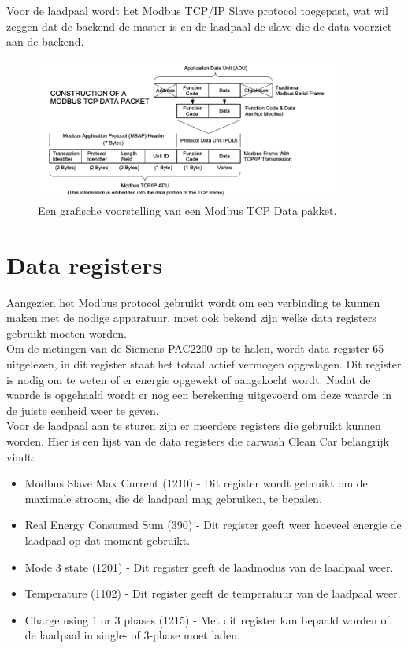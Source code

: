 Voor de laadpaal wordt het Modbus TCP/IP Slave protocol toegepast, wat wil zeggen dat de backend de master is en de laadpaal de slave die de data voorziet aan de backend.

\begin{figure}[h]
    \includegraphics[width=10cm]{./graphics/Modbus-TCP-schema.png}
    \caption{Een grafische voorstelling van een Modbus TCP Data pakket. \autocite{Acromag2005}}
    \label{fig:modbus-data-pakket}
\end{figure}

\section{Data registers}
\label{sec:stand-van-zaken-dataregisters}

Aangezien het Modbus protocol gebruikt wordt om een verbinding te kunnen maken met de nodige apparatuur, moet ook bekend zijn welke data registers gebruikt moeten worden.\\

Om de metingen van de Siemens PAC2200 op te halen, wordt data register 65 uitgelezen, in dit register staat het totaal actief vermogen opgeslagen. Dit register is nodig om te weten of er energie opgewekt of aangekocht wordt. Nadat de waarde is opgehaald wordt er nog een berekening uitgevoerd om deze waarde in de juiste eenheid weer te geven.\\

Voor de laadpaal aan te sturen zijn er meerdere registers die gebruikt kunnen worden. Hier is een lijst van de data registers die carwash Clean Car belangrijk vindt:

\begin{itemize}
    \item Modbus Slave Max Current (1210) - Dit register wordt gebruikt om de maximale stroom, die de laadpaal mag gebruiken, te bepalen.
    \item Real Energy Consumed Sum (390) - Dit register geeft weer hoeveel energie de laadpaal op dat moment gebruikt.
    \item Mode 3 state (1201) - Dit register geeft de laadmodus van de laadpaal weer.
    \item Temperature (1102) - Dit register geeft de temperatuur van de laadpaal weer.
    \item Charge using 1 or 3 phases (1215) - Met dit register kan bepaald worden of de laadpaal in single- of 3-phase moet laden.
\end{itemize}

